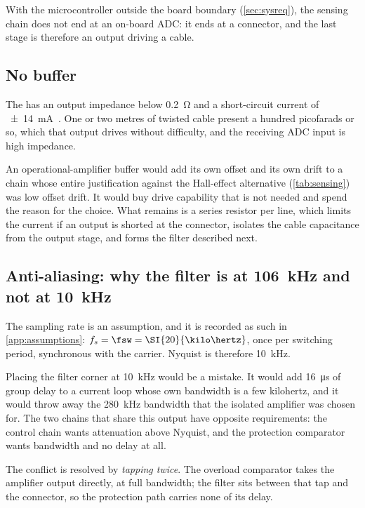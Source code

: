 With the microcontroller outside the board boundary (\cref{sec:sysreq}), the
sensing chain does not end at an on-board ADC: it ends at a connector, and
the last stage is therefore an output driving a cable.

\subsection{No buffer}

The \isoamp{} has an output impedance below \SI{0.2}{\ohm} and a
short-circuit current of \SI{\pm 14}{\milli\ampere}~\cite{ti_amc1302}. One
or two metres of twisted cable present a hundred picofarads or so, which
that output drives without difficulty, and the receiving ADC input is high
impedance.

An operational-amplifier buffer would add its own offset and its own drift
to a chain whose entire justification against the Hall-effect alternative
(\cref{tab:sensing}) was low offset drift. It would buy drive capability
that is not needed and spend the reason for the choice. What remains is a
series resistor per line, which limits the current if an output is shorted
at the connector, isolates the cable capacitance from the output stage, and
forms the filter described next.

\subsection{Anti-aliasing: why the filter is at \texorpdfstring{\SI{106}{\kilo\hertz}}{106 kHz} and not at \texorpdfstring{\SI{10}{\kilo\hertz}}{10 kHz}}
\label{sec:aafilter}

The sampling rate is an assumption, and it is recorded as such in
\cref{app:assumptions}: $f_s = \fsw = \SI{20}{\kilo\hertz}$, once per
switching period, synchronous with the carrier. Nyquist is therefore
\SI{10}{\kilo\hertz}.

Placing the filter corner at \SI{10}{\kilo\hertz} would be a mistake. It
would add \SI{16}{\micro\second} of group delay to a current loop whose
own bandwidth is a few kilohertz, and it would throw away the
\SI{280}{\kilo\hertz} bandwidth that the isolated amplifier was chosen for.
The two chains that share this output have opposite requirements: the
control chain wants attenuation above Nyquist, and the protection
comparator wants bandwidth and no delay at all.

The conflict is resolved by \emph{tapping twice}. The overload comparator
takes the amplifier output directly, at full bandwidth; the filter sits
between that tap and the connector, so the protection path carries none of
its delay.

